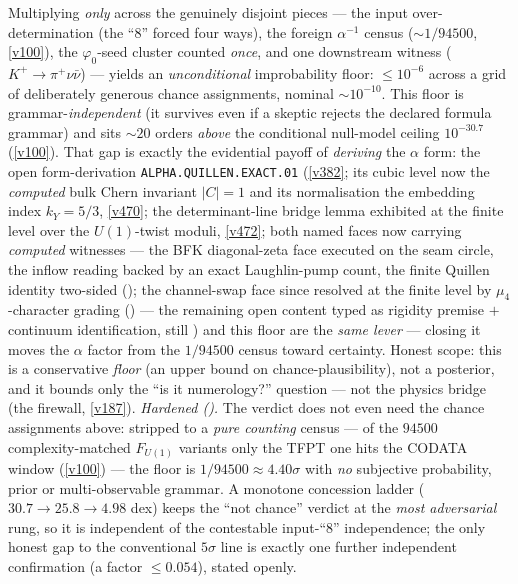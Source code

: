 \documentclass[11pt,a4paper]{article}
\begin{document}
\begin{keybox}
Multiplying \emph{only} across the genuinely disjoint pieces --- the input over-determination (the ``$8$''
forced four ways), the foreign $\alpha^{-1}$ census ($\sim1/94500$, \vref{v100}), the $\varphi_0$-seed cluster
counted \emph{once}, and one downstream witness ($K^+\!\to\!\pi^+\nu\bar\nu$) --- yields an \emph{unconditional}
improbability floor: $\le 10^{-6}$ across a grid of deliberately generous chance assignments, nominal
$\sim 10^{-10}$. This floor is grammar-\emph{independent} (it survives even if a skeptic rejects the declared
formula grammar) and sits $\sim20$ orders \emph{above} the conditional null-model ceiling $10^{-30.7}$
(\vref{v100}). That gap is exactly the evidential payoff of \emph{deriving} the $\alpha$ form: the open
form-derivation \texttt{ALPHA.QUILLEN.EXACT.01} (\vref{v382}; its cubic level now the \emph{computed} bulk Chern
invariant $|C|{=}1$ and its normalisation the embedding index $k_Y{=}5/3$, \vref{v470}; the determinant-line
bridge lemma exhibited at the finite level over the $U(1)$-twist moduli, \vref{v472}; both named faces now
carrying \emph{computed} witnesses --- the BFK diagonal-zeta face executed on the seam circle, the inflow
reading backed by an exact Laughlin-pump count, the finite Quillen identity two-sided
(); the channel-swap face since resolved at the finite level by
$\mu_4$-character grading () --- the remaining open content typed
as rigidity premise $+$ continuum identification, still \mO) and this
floor are the \emph{same lever} ---
closing it moves the $\alpha$ factor from the $1/94500$ census toward certainty. Honest scope: this is a
conservative \emph{floor} (an upper bound on chance-plausibility), not a posterior, and it bounds only the
``is it numerology?'' question --- not the physics bridge (the firewall, \vref{v187}).
\emph{Hardened ().} The verdict does not even need the chance assignments
above: stripped to a \emph{pure counting} census --- of the $94500$ complexity-matched $F_{U(1)}$ variants
only the TFPT one hits the CODATA window (\vref{v100}) --- the floor is $1/94500\approx4.40\sigma$ with
\emph{no} subjective probability, prior or multi-observable grammar. A monotone concession ladder
($30.7\!\to\!25.8\!\to\!4.98$ dex) keeps the ``not chance'' verdict at the \emph{most adversarial} rung, so
it is independent of the contestable input-``$8$'' independence; the only honest gap to the conventional
$5\sigma$ line is exactly one further independent confirmation (a factor $\le0.054$), stated openly.
\end{keybox}
\end{document}
